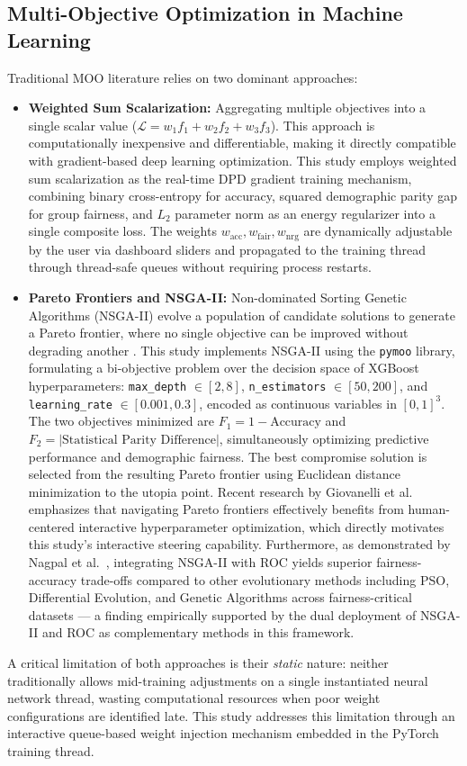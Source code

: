 \documentclass[12pt,a4paper]{article}
\begin{document}
\subsection{Multi-Objective Optimization in Machine Learning}
Traditional MOO literature relies on two dominant approaches:
\begin{itemize}
    \item \textbf{Weighted Sum Scalarization:} Aggregating multiple objectives into a single scalar value ($\mathcal{L} = w_1 f_1 + w_2 f_2 + w_3 f_3$). This approach is computationally inexpensive and differentiable, making it directly compatible with gradient-based deep learning optimization. This study employs weighted sum scalarization as the real-time DPD gradient training mechanism, combining binary cross-entropy for accuracy, squared demographic parity gap for group fairness, and $L_2$ parameter norm as an energy regularizer into a single composite loss. The weights $w_{\text{acc}}, w_{\text{fair}}, w_{\text{nrg}}$ are dynamically adjustable by the user via dashboard sliders and propagated to the training thread through thread-safe queues without requiring process restarts.
    \item \textbf{Pareto Frontiers and NSGA-II:} Non-dominated Sorting Genetic Algorithms (NSGA-II) evolve a population of candidate solutions to generate a Pareto frontier, where no single objective can be improved without degrading another \cite{deb2002nsga2}. This study implements NSGA-II using the \texttt{pymoo} library, formulating a bi-objective problem over the decision space of XGBoost hyperparameters: \texttt{max\_depth} $\in [2, 8]$, \texttt{n\_estimators} $\in [50, 200]$, and \texttt{learning\_rate} $\in [0.001, 0.3]$, encoded as continuous variables in $[0, 1]^3$. The two objectives minimized are $F_1 = 1 - \text{Accuracy}$ and $F_2 = |\text{Statistical Parity Difference}|$, simultaneously optimizing predictive performance and demographic fairness. The best compromise solution is selected from the resulting Pareto frontier using Euclidean distance minimization to the utopia point. Recent research by Giovanelli et al.\ \cite{giovanelli2024interactive} emphasizes that navigating Pareto frontiers effectively benefits from human-centered interactive hyperparameter optimization, which directly motivates this study's interactive steering capability. Furthermore, as demonstrated by Nagpal et al.\ \cite{nagpal2024multiobj}, integrating NSGA-II with ROC yields superior fairness-accuracy trade-offs compared to other evolutionary methods including PSO, Differential Evolution, and Genetic Algorithms across fairness-critical datasets --- a finding empirically supported by the dual deployment of NSGA-II and ROC as complementary methods in this framework.
\end{itemize}
A critical limitation of both approaches is their \textit{static} nature: neither traditionally allows mid-training adjustments on a single instantiated neural network thread, wasting computational resources when poor weight configurations are identified late. This study addresses this limitation through an interactive queue-based weight injection mechanism embedded in the PyTorch training thread.
\end{document}
